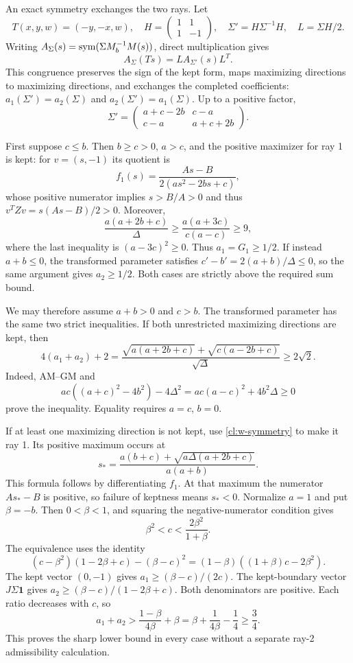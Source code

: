 An exact symmetry exchanges the two rays. Let
\[
 T(x,y,w)=(-y,-x,w),\quad
 H=\begin{pmatrix}1&1\\1&-1\end{pmatrix},\quad
 \Sigma'=H\Sigma^{-1}H,\quad L=\Sigma H/2.
\]
Writing $A_\Sigma(s)=\operatorname{sym}(\Sigma M_b^{-1}M(s))$, direct multiplication
gives
\begin{equation}\label{cl:w-symmetry}
 A_\Sigma(Ts)=L A_{\Sigma'}(s)L^T.
\end{equation}
This congruence preserves the sign of the kept form, maps maximizing
directions to maximizing directions, and exchanges the completed
coefficients: $a_1(\Sigma')=a_2(\Sigma)$ and
$a_2(\Sigma')=a_1(\Sigma)$.
Up to a positive factor,
\[
 \Sigma'=\begin{pmatrix}a+c-2b&c-a\\c-a&a+c+2b\end{pmatrix}.
\]

First suppose $c\le b$. Then $b\ge c>0$, $a>c$, and the positive
maximizer for ray 1 is kept: for $v=(s,-1)$ its quotient is
\[
 f_1(s)=\frac{As-B}{2(as^2-2bs+c)},
\]
whose positive numerator implies $s>B/A>0$ and thus
$v^TZv=s(As-B)/2>0$. Moreover,
\[
 \frac{a(a+2b+c)}{\Delta}
 \ge\frac{a(a+3c)}{c(a-c)}\ge9,
\]
where the last inequality is $(a-3c)^2\ge0$.
Thus $a_1=G_1\ge1/2$.
If instead $a+b\le0$, the transformed parameter satisfies
$c'-b'=2(a+b)/\Delta\le0$, so the same argument gives $a_2\ge1/2$.
Both cases are strictly above the required sum bound.

We may therefore assume $a+b>0$ and $c>b$.
The transformed parameter has the same two strict inequalities.
If both unrestricted maximizing directions are kept, then
\[
 4(a_1+a_2)+2
 =\frac{\sqrt{a(a+2b+c)}+\sqrt{c(a-2b+c)}}{\sqrt\Delta}
 \ge2\sqrt2.
\]
Indeed, AM--GM and
\[
 ac((a+c)^2-4b^2)-4\Delta^2
 =ac(a-c)^2+4b^2\Delta\ge0
\]
prove the inequality. Equality requires $a=c$, $b=0$.

If at least one maximizing direction is not kept, use
\cref{cl:w-symmetry} to make it ray 1. Its positive maximum occurs at
\[
 s_*=
 \frac{a(b+c)+\sqrt{a\Delta(a+2b+c)}}{a(a+b)}.
\]
This formula follows by differentiating $f_1$.
At that maximum the numerator $As_*-B$ is positive, so failure of
keptness means $s_*<0$. Normalize $a=1$ and put $\beta=-b$.
Then $0<\beta<1$, and squaring the negative-numerator condition gives
\[
 \beta^2<c<\frac{2\beta^2}{1+\beta}.
\]
The equivalence uses the identity
\[
 (c-\beta^2)(1-2\beta+c)-(\beta-c)^2
 =(1-\beta)((1+\beta)c-2\beta^2).
\]
The kept vector $(0,-1)$ gives
$a_1\ge(\beta-c)/(2c)$.
The kept-boundary vector $J\Sigma\mathbf1$ gives
$a_2\ge(\beta-c)/(1-2\beta+c)$.
Both denominators are positive. Each ratio decreases with $c$, so
\[
 a_1+a_2>
 \frac{1-\beta}{4\beta}+\beta
 =\beta+\frac1{4\beta}-\frac14\ge\frac34.
\]
This proves the sharp lower bound in every case without a separate
ray-2 admissibility calculation.

